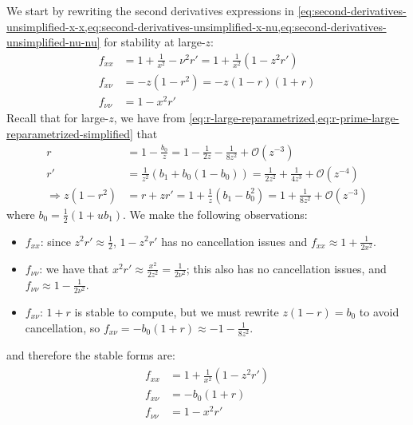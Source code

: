 \documentclass{article}
\begin{document}
We start by rewriting the second derivatives expressions in \cref{eq:second-derivatives-unsimplified-x-x,eq:second-derivatives-unsimplified-x-nu,eq:second-derivatives-unsimplified-nu-nu} for stability at large-$z$:
%
\begin{align}
  f_{xx}     & = 1 + \frac{1}{x^2} - \nu^2 r' = 1 + \frac{1}{x^2}(1 - z^2 r') \\
  f_{x\nu}   & = -z(1 - r^2) = -z (1 - r) (1 + r)                             \\
  f_{\nu\nu} & = 1 - x^2 r'
\end{align}
%
Recall that for large-$z$, we have from \cref{eq:r-large-reparametrized,eq:r-prime-large-reparametrized-simplified} that
\begin{align}
  r                      & = 1 - \frac{b_0}{z} = 1 - \frac{1}{2z} - \frac{1}{8z^2} + \mathcal{O}(z^{-3})                \\
  r'                     & = \frac{1}{z^2} (b_1 + b_0(1 - b_0)) = \frac{1}{2z^2} + \frac{1}{4z^3} + \mathcal{O}(z^{-4}) \\
  \Rightarrow z(1 - r^2) & = r + z r' = 1 + \frac{1}{z} (b_1 - b_0^2) = 1 + \frac{1}{8z^2} + \mathcal{O}(z^{-3})
\end{align}
where $b_0 = \frac{1}{2} (1 + u b_1)$.
%
We make the following observations:
%
\begin{itemize}
  \item $f_{xx}$:
        since $z^2 r' \approx \frac{1}{2}$, $1 - z^2 r'$ has no cancellation issues and $f_{xx} \approx 1 + \frac{1}{2x^2}$.
  \item $f_{\nu\nu}$:
        we have that $x^2 r' \approx \frac{x^2}{2z^2} = \frac{1}{2\nu^2}$;
        this also has no cancellation issues, and $f_{\nu\nu} \approx 1 - \frac{1}{2\nu^2}$.
  \item $f_{x\nu}$:
        $1 + r$ is stable to compute, but we must rewrite $z(1 - r) = b_0$ to avoid cancellation, so $f_{x\nu} = -b_0(1 + r) \approx -1 - \frac{1}{8z^2}$.
\end{itemize}
%
and therefore the stable forms are:
%
\begin{align}\label{eq:second-derivatives-large-z}
  \boxed{
    \begin{aligned}
      f_{xx}     & = 1 + \frac{1}{x^2}(1 - z^2 r') \\
      f_{x\nu}   & = -b_0 (1 + r)                  \\
      f_{\nu\nu} & = 1 - x^2 r'
    \end{aligned}
  }
\end{align}
\end{document}
